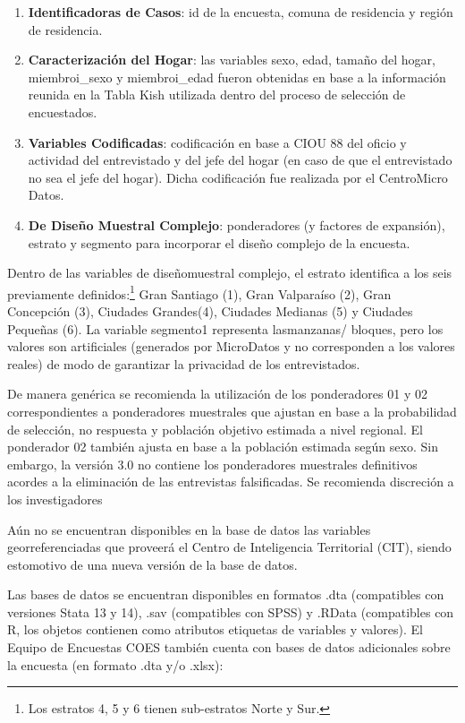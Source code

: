 \documentclass[
]{book}
\begin{document}
\begin{enumerate}
\def\labelenumi{\arabic{enumi}.}
\item
  \textbf{Identificadoras de Casos}: id de la encuesta, comuna de residencia y región de residencia.
\item
  \textbf{Caracterización del Hogar}: las variables sexo, edad, tamaño del hogar, miembroi\_sexo y miembroi\_edad fueron obtenidas en base a la información reunida en la Tabla Kish utilizada dentro del proceso de selección de encuestados.
\item
  \textbf{Variables Codificadas}: codificación en base a CIOU 88 del oficio y actividad del entrevistado y del jefe del hogar (en caso de que el entrevistado no sea el jefe del hogar). Dicha codificación fue realizada por el CentroMicro Datos.
\item
  \textbf{De Diseño Muestral Complejo}: ponderadores (y factores de expansión), estrato y segmento para incorporar el diseño complejo de la encuesta.
\end{enumerate}

Dentro de las variables de diseñomuestral complejo, el estrato identifica a los seis previamente definidos:\footnote{Los estratos 4, 5 y 6 tienen sub-estratos Norte y Sur.} Gran Santiago (1), Gran Valparaíso (2), Gran Concepción (3), Ciudades Grandes(4), Ciudades Medianas (5) y Ciudades Pequeñas (6). La variable segmento1 representa lasmanzanas/ bloques, pero los valores son artificiales (generados por MicroDatos y no corresponden a los valores reales) de modo de garantizar la privacidad de los entrevistados.

{De manera genérica se recomienda la utilización de los ponderadores 01 y 02 correspondientes a ponderadores muestrales que ajustan en base a la probabilidad de selección, no respuesta y población objetivo estimada a nivel regional. El ponderador 02 también ajusta en base a la población estimada según sexo. Sin embargo, la versión 3.0 no contiene los ponderadores muestrales definitivos acordes a la eliminación de las entrevistas falsificadas. Se recomienda discreción a los investigadores}

Aún no se encuentran disponibles en la base de datos las variables georreferenciadas que proveerá el Centro de Inteligencia Territorial (CIT), siendo estomotivo de una nueva versión de la base de datos.

Las bases de datos se encuentran disponibles en formatos .dta (compatibles con versiones Stata 13 y 14), .sav (compatibles con SPSS) y .RData (compatibles con R, los objetos contienen como atributos etiquetas de variables y valores). El Equipo de Encuestas COES también cuenta con bases de datos adicionales sobre la encuesta (en formato .dta y/o .xlsx):
\end{document}
